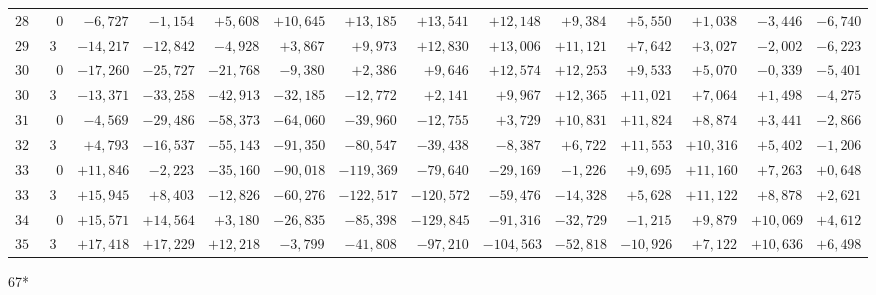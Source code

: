 \begin{landscape}
\begin{longtable}{@{}rr|r|r|r|r|r|r|r|r|r|r|r|r@{}}
\(285\) & \(0\) & \(-6{,}727\) & \(-1{,}154\) & \(+5{,}608\) & \(+10{,}645\) & \(+13{,}185\) & \(+13{,}541\) & \(+12{,}148\) & \(+9{,}384\) & \(+5{,}550\) & \(+1{,}038\) & \(-3{,}446\) & \(-6{,}740\)\\
\(292\) & \(30\) & \(-14{,}217\) & \(-12{,}842\) & \(-4{,}928\) & \(+3{,}867\) & \(+9{,}973\) & \(+12{,}830\) & \(+13{,}006\) & \(+11{,}121\) & \(+7{,}642\) & \(+3{,}027\) & \(-2{,}002\) & \(-6{,}223\)\\[2pt]
\(300\) & \(0\) & \(-17{,}260\) & \(-25{,}727\) & \(-21{,}768\) & \(-9{,}380\) & \(+2{,}386\) & \(+9{,}646\) & \(+12{,}574\) & \(+12{,}253\) & \(+9{,}533\) & \(+5{,}070\) & \(-0{,}339\) & \(-5{,}401\)\\
\(307\) & \(30\) & \(-13{,}371\) & \(-33{,}258\) & \(-42{,}913\) & \(-32{,}185\) & \(-12{,}772\) & \(+2{,}141\) & \(+9{,}967\) & \(+12{,}365\) & \(+11{,}021\) & \(+7{,}064\) & \(+1{,}498\) & \(-4{,}275\)\\
\(315\) & \(0\) & \(-4{,}569\) & \(-29{,}486\) & \(-58{,}373\) & \(-64{,}060\) & \(-39{,}960\) & \(-12{,}755\) & \(+3{,}729\) & \(+10{,}831\) & \(+11{,}824\) & \(+8{,}874\) & \(+3{,}441\) & \(-2{,}866\)\\
\(322\) & \(30\) & \(+4{,}793\) & \(-16{,}537\) & \(-55{,}143\) & \(-91{,}350\) & \(-80{,}547\) & \(-39{,}438\) & \(-8{,}387\) & \(+6{,}722\) & \(+11{,}553\) & \(+10{,}316\) & \(+5{,}402\) & \(-1{,}206\)\\[2pt]
\(330\) & \(0\) & \(+11{,}846\) & \(-2{,}223\) & \(-35{,}160\) & \(-90{,}018\) & \(-119{,}369\) & \(-79{,}640\) & \(-29{,}169\) & \(-1{,}226\) & \(+9{,}695\) & \(+11{,}160\) & \(+7{,}263\) & \(+0{,}648\)\\
\(337\) & \(30\) & \(+15{,}945\) & \(+8{,}403\) & \(-12{,}826\) & \(-60{,}276\) & \(-122{,}517\) & \(-120{,}572\) & \(-59{,}476\) & \(-14{,}328\) & \(+5{,}628\) & \(+11{,}122\) & \(+8{,}878\) & \(+2{,}621\)\\
\(345\) & \(0\) & \(+15{,}571\) & \(+14{,}564\) & \(+3{,}180\) & \(-26{,}835\) & \(-85{,}398\) & \(-129{,}845\) & \(-91{,}316\) & \(-32{,}729\) & \(-1{,}215\) & \(+9{,}879\) & \(+10{,}069\) & \(+4{,}612\)\\
\(352\) & \(30\) & \(+17{,}418\) & \(+17{,}229\) & \(+12{,}218\) & \(-3{,}799\) & \(-41{,}808\) & \(-97{,}210\) & \(-104{,}563\) & \(-52{,}818\) & \(-10{,}926\) & \(+7{,}122\) & \(+10{,}636\) & \(+6{,}498\)\\
\end{longtable}
\begin{flushright}\small 67*\end{flushright}

\end{landscape}
